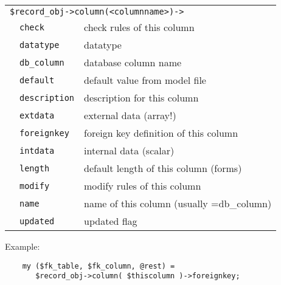 \smallskip
\begin{tabular}{rl|l}
\multicolumn{3}{l}{\texttt{\$record\_obj->column(<columnname>)->}} \\
         & \verb+check+         & check rules of this column \\
         & \verb+datatype+      & datatype \\
         & \verb+db_column+     & database column name \\
         & \verb+default+       & default value from model file \\
         & \verb+description+   & description for this column \\
         & \verb+extdata+       & external data (array!) \\
         & \verb+foreignkey+    & foreign key definition of this column \\
         & \verb+intdata+       & internal data (scalar) \\
         & \verb+length+        & default length of this column (forms) \\
         & \verb+modify+        & modify rules of this column \\
         & \verb+name+          & name of this column (usually =db\_column) \\
         & \verb+updated+       & updated flag \\
\end{tabular}
\medskip

Example:

\begin{verbatim}
    my ($fk_table, $fk_column, @rest) =
       $record_obj->column( $thiscolumn )->foreignkey;
\end{verbatim}

